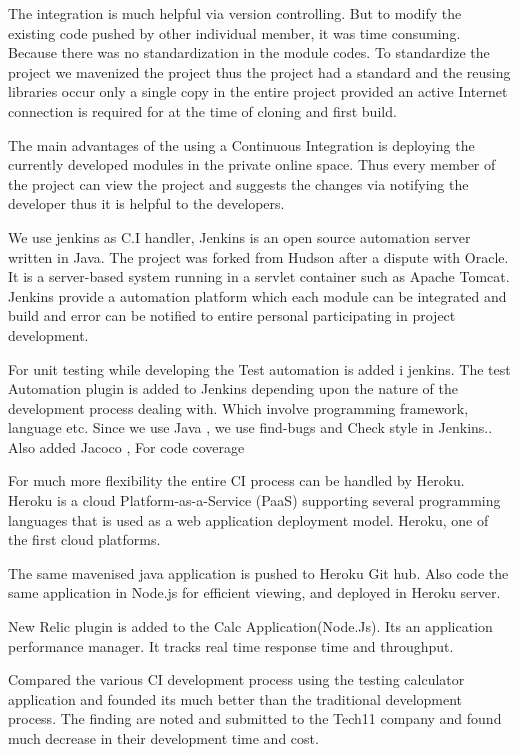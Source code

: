 \documentclass[12pt,a4paper,oneside]{report}
\begin{document}
{   \par
   The integration is much helpful via version controlling.  But to modify the existing code pushed by other individual member, it was time consuming. Because there was no standardization in the module codes. To standardize the project we mavenized the project thus the project had a standard and the reusing libraries  occur only a single copy in the entire project provided an active Internet connection is required for at the time of cloning and first build. \par
   The main advantages of the using a Continuous Integration is deploying the currently developed modules in the private online space. Thus every member of the project can view the project and suggests the changes via notifying the developer thus it is helpful to the developers. \par
   We use jenkins as C.I handler, Jenkins is an open source automation server written in Java. The project was forked from Hudson after a dispute with Oracle. It is a server-based system running in a servlet container such as Apache Tomcat. Jenkins provide a automation platform which each module can be integrated and build and error can be notified to entire personal participating in project development.
   \par For unit testing while developing the Test automation is added i jenkins. The test Automation plugin is added to Jenkins depending upon the nature of the development process dealing with. Which involve programming framework, language etc. Since we use Java , we use ﬁnd-bugs and Check style in Jenkins.. Also added Jacoco , For code coverage
 \par
  For much more flexibility the entire CI process can be handled by Heroku. Heroku is a cloud Platform-as-a-Service (PaaS) supporting several programming languages that is used as a web application deployment model. Heroku, one of the ﬁrst cloud platforms. \par
  The same mavenised java application is pushed to Heroku Git hub. Also code the same application in Node.js for efficient viewing, and deployed in Heroku server. \par
  New Relic plugin is added to the Calc Application(Node.Js). Its an application performance manager. It tracks real time response time and throughput.
   \par
   Compared the various CI development process using the testing calculator application and founded its much better than the traditional development process. The finding are noted and submitted to the Tech11 company and found much decrease in their development time and cost.
    \newpage

}
\end{document}
